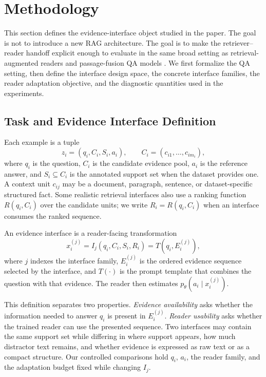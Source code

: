 \documentclass[a4paper,fleqn]{cas-sc}
\begin{document}
\section{Methodology}

This section defines the evidence-interface object studied in the paper. The
goal is not to introduce a new RAG architecture. The goal is to make the
retriever--reader handoff explicit enough to evaluate in the same broad
setting as retrieval-augmented readers and passage-fusion QA models
\citep{lewis2020rag,izacard2021fid}. We first formalize the QA setting, then
define the interface design space, the concrete interface families, the reader
adaptation objective, and the diagnostic quantities used in the experiments.

\subsection{Task and Evidence Interface Definition}

Each example is a tuple
\begin{equation}
z_i = (q_i, C_i, S_i, a_i),
\qquad
C_i = (c_{i1}, \ldots, c_{im_i}),
\label{eq:example}
\end{equation}
where $q_i$ is the question, $C_i$ is the candidate evidence pool, $a_i$ is the
reference answer, and $S_i \subseteq C_i$ is the annotated support set when the
dataset provides one. A context unit $c_{ij}$ may be a document, paragraph,
sentence, or dataset-specific structured fact. Some realistic retrieval
interfaces also use a ranking function $R(q_i,C_i)$ over the candidate units;
we write $R_i=R(q_i,C_i)$ when an interface consumes the ranked sequence.

An evidence interface is a reader-facing transformation
\begin{equation}
x_i^{(j)} = I_j(q_i, C_i, S_i, R_i)
          = T(q_i, E_i^{(j)}),
\label{eq:interface-map}
\end{equation}
where $j$ indexes the interface family, $E_i^{(j)}$ is the ordered evidence
sequence selected by the interface, and $T(\cdot)$ is the prompt template that
combines the question with that evidence. The reader then estimates
$p_\theta(a_i \mid x_i^{(j)})$.

This definition separates two properties. \emph{Evidence availability} asks
whether the information needed to answer $q_i$ is present in $E_i^{(j)}$.
\emph{Reader usability} asks whether the trained reader can use the presented
sequence. Two interfaces may contain the same support set while differing in
where support appears, how much distractor text remains, and whether evidence
is expressed as raw text or as a compact structure. Our controlled comparisons
hold $q_i$, $a_i$, the reader family, and the adaptation budget fixed while
changing $I_j$.
\end{document}
